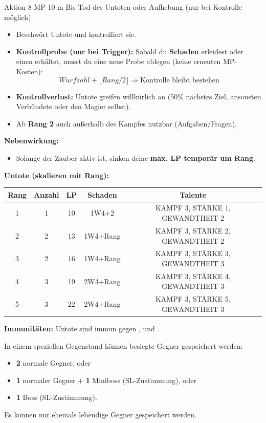 \spellcard
{}
{Aktion}
{8 MP}
{10 m}
{Bis Tod des Untoten oder Aufhebung (nur bei Kontrolle möglich)}
{
	\begin{itemize}
		\item Beschwört Untote und kontrolliert sie.
		\item \textbf{Kontrollprobe (nur bei Trigger):}
		Sobald du \textbf{Schaden} erleidest oder einen  erhältst,
		musst du eine neue Probe ablegen (keine erneuten MP-Kosten):
		$$
		Wurfzahl + \lfloor Rang/2 \rfloor \Rightarrow \text{Kontrolle bleibt bestehen}
		$$
		\item \textbf{Kontrollverlust:} Untote greifen willkürlich an (50\% nächstes Ziel,
		ansonsten Verbündete oder den Magier selbst).
		\item Ab \textbf{Rang 2} auch außerhalb des Kampfes nutzbar (Aufgaben/Fragen).
	\end{itemize}
	
	\medskip
	\textbf{Nebenwirkung:}
	\begin{itemize}
		\item Solange der Zauber aktiv ist, sinken deine \textbf{max. LP temporär um Rang}.
	\end{itemize}
	
	\medskip
	\textbf{Untote (skalieren mit Rang):}
	\begin{center}
		\begin{tabular}{ccccc}
			\toprule
			\textbf{Rang} & \textbf{Anzahl} & \textbf{LP} & \textbf{Schaden} & \textbf{Talente} \\
			\midrule
			1 & 1 & 10 & 1W4+2 & KAMPF 3, STÄRKE 1, GEWANDTHEIT 2 \\
			2 & 2 & 13 & 1W4+Rang & KAMPF 3, STÄRKE 2, GEWANDTHEIT 2 \\
			3 & 2 & 16 & 1W4+Rang & KAMPF 3, STÄRKE 3, GEWANDTHEIT 3 \\
			4 & 3 & 19 & 2W4+Rang & KAMPF 3, STÄRKE 4, GEWANDTHEIT 3 \\
			5 & 3 & 22 & 2W4+Rang & KAMPF 3, STÄRKE 5, GEWANDTHEIT 3 \\
			\bottomrule
		\end{tabular}
	\end{center}
	
	\textbf{Immunitäten:}
	Untote sind immun gegen ,  und .
}
{
	In einem speziellen Gegenstand können besiegte Gegner gespeichert werden:
	\begin{itemize}
		\item \textbf{2} normale Gegner, oder
		\item \textbf{1} normaler Gegner + \textbf{1} Miniboss (SL-Zustimmung), oder
		\item \textbf{1} Boss (SL-Zustimmung).
	\end{itemize}
	Es können nur ehemals lebendige Gegner gespeichert werden.
}

